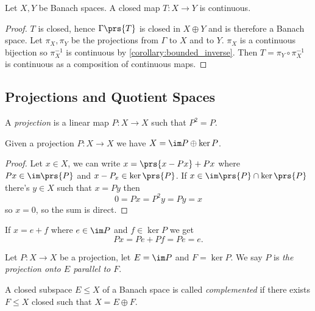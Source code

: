 \documentclass[10pt, twoside]{book}
\begin{document}
\begin{theorem}
Let $X,Y$ be Banach spaces. A closed map $T \colon X \to Y$ is continuous.
\end{theorem}

\begin{proof}
$T$ is closed, hence $\Gamma\prs{T}$ is closed in $X \oplus Y$ and is therefore a Banach space. Let $\pi_X, \pi_Y$ be the projections from $\Gamma$ to $X$ and to $Y$. $\pi_X$ is a continuous bijection so $\pi_X^{-1}$ is continuous by \ref{corollary:bounded_inverse}. Then
$T = \pi_Y \circ \pi_X^{-1}$ is continuous as a composition of continuous maps.
\end{proof}

\subsection{Projections and Quotient Spaces}

\begin{definition}[Projection]
A \emph{projection} is a linear map $P \colon X \to X$ such that $P^2 = P$.
\end{definition}

\begin{proposition}
Given a projection $P \colon X \to X$ we have $X = \im P \oplus \ker P$.
\end{proposition}

\begin{proof}
Let $x \in X$, we can write $x = \prs{x - Px} + Px$ where $Px \in \im\prs{P}$ and $x - P_x \in \ker \prs{P}$. If $x \in \im\prs{P} \cap \ker\prs{P}$ there's $y \in X$ such that $x = Py$ then
\[0 = Px = P^2 y = Py = x\]
so $x = 0$, so the sum is direct.
\end{proof}

\begin{remark}
If $x = e + f$ where $e \in \im P$ and $f \in \ker P$ we get
\[Px = Pe + Pf = Pe = e \text{.}\]
\end{remark}

\begin{definition}
Let $P \colon X \to X$ be a projection, let $E = \im P$ and $F = \ker P$. We say $P$ is \emph{the projection onto $E$ parallel to $F$}.
\end{definition}

\begin{definition}
A closed subspace $E \leq X$ of a Banach space is called \emph{complemented} if there exists $F \leq X$ closed such that $X = E \oplus F$.
\end{definition}
\end{document}
